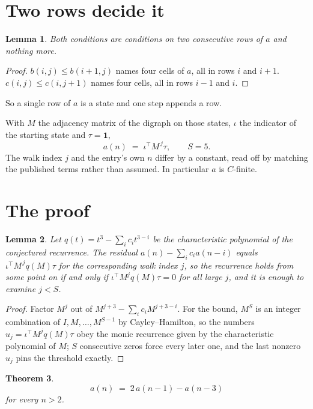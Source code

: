 \documentclass[11pt,a4paper]{article}
\theoremstyle{plain}
\newtheorem{theorem}{Theorem}
\newtheorem{lemma}[theorem]{Lemma}
\theoremstyle{definition}
\begin{document}
\section{Two rows decide it}

\begin{lemma}\label{lem:win}
Both conditions are conditions on two consecutive rows of $a$ and nothing more.
\end{lemma}

\begin{proof}
$b(i,j)\le b(i{+}1,j)$ names four cells of $a$, all in rows $i$ and $i+1$. $c(i,j)\le
c(i,j{+}1)$ names four cells, all in rows $i-1$ and $i$.
\end{proof}

So a single row of $a$ is a state and one step appends a row.

With $M$ the adjacency matrix of the digraph on those states, $\iota$ the indicator of the
starting state and $\tau=\mathbf{1}$,
\[
a(n)\;=\;\iota^{\!\top}M^{\,j}\tau ,\qquad S=5.
\]
The walk index $j$ and the entry's own $n$ differ by a constant, read off by matching the
published terms rather than assumed. In particular $a$ is $C$-finite.

\section{The proof}

\begin{lemma}\label{lem:crit}
Let $q(t)=t^{3}-\sum_i c_it^{3-i}$ be the characteristic polynomial of the
conjectured recurrence. The residual $a(n)-\sum_ic_ia(n-i)$ equals
$\iota^{\!\top}M^{\,j}q(M)\tau$ for the corresponding walk index $j$, so the recurrence
holds from some point on if and only if $\iota^{\!\top}M^{j}q(M)\tau=0$ for all large $j$,
and it is enough to examine $j<S$.
\end{lemma}

\begin{proof}
Factor $M^{j}$ out of $M^{j+3}-\sum_ic_iM^{j+3-i}$. For the bound, $M^{S}$
is an integer combination of $I,M,\dots,M^{S-1}$ by Cayley--Hamilton, so the numbers
$u_j=\iota^{\!\top}M^{j}q(M)\tau$ obey the monic recurrence given by the characteristic
polynomial of $M$; $S$ consecutive zeros force every later one, and the last nonzero $u_j$
pins the threshold exactly.
\end{proof}

\begin{theorem}
\[
a(n)\;=\;2\,a(n-1) - a(n-3)
\]
for every $n>2$.
\end{theorem}
\end{document}
